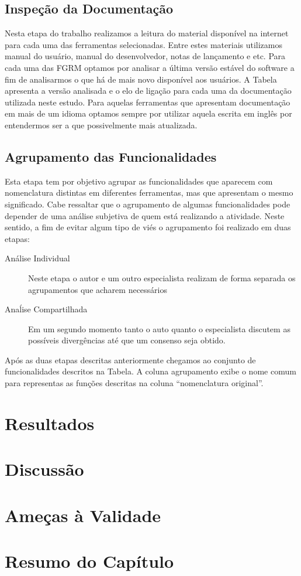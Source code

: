 
\subsection{Inspeção da Documentação}
\label{subsec:inspecao_doumentacao}

Nesta etapa do trabalho realizamos a leitura do material disponível na internet
para cada uma das ferramentas selecionadas. Entre estes materiais utilizamos
manual do usuário, manual do desenvolvedor, notas de lançamento e etc. Para cada
uma das FGRM optamos por analisar a última versão estável do software a fim de
analisarmos o que há de mais novo disponível aos usuários. A Tabela apresenta a
versão analisada e o elo de ligação para cada uma da documentação utilizada
neste estudo. Para aquelas ferramentas que apresentam documentação em mais de um
idioma optamos sempre por utilizar aquela escrita em inglês por entendermos ser
a que possivelmente mais atualizada.

\subsection{Agrupamento das Funcionalidades}
\label{subsec:agrupamento_fucionalidades}

Esta etapa tem por objetivo agrupar as funcionalidades que aparecem com
nomenclatura distintas em diferentes ferramentas, mas que apresentam o mesmo
significado. Cabe ressaltar que o agrupamento de algumas funcionalidades pode
depender de uma análise subjetiva de quem está realizando a atividade.  Neste
sentido, a fim de evitar algum tipo de viés o agrupamento foi realizado em duas
etapas:

\begin{description}
	\item[Análise Individual] Neste etapa o autor e um outro especialista
		realizam de forma separada os agrupamentos que acharem necessários
	\item[Anaĺise Compartilhada] Em um segundo momento tanto o auto quanto o
		especialista discutem as possíveis divergências até que um consenso seja
		obtido.
\end{description}

Após as duas etapas descritas anteriormente chegamos ao conjunto de
funcionalidades descritos na Tabela. A coluna agrupamento exibe o nome comum
para representas as funções descritas na coluna ``nomenclatura original''.



\section{Resultados}
\label{sec:resultados}



\section{Discussão}
\label{sec:discussao}

\section{Ameças à Validade}
\label{sec:ameacas_a_validade}


\section{Resumo do Capítulo}
\label{sec:resumo_do_capitulo}